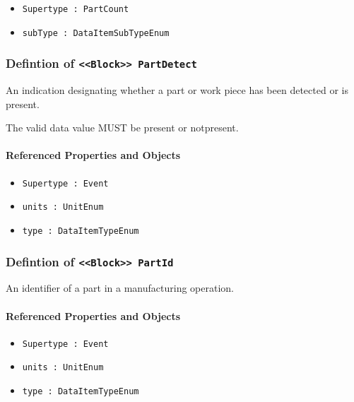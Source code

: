 \begin{itemize}
\item \texttt{Supertype : PartCount}

\item \texttt{subType : DataItemSubTypeEnum}

\end{itemize}
\FloatBarrier
\subsubsection{Defintion of \texttt{<<Block>> PartDetect}}
  \label{type:PartDetect}

\FloatBarrier

An indication designating whether a part or work piece has been detected or is present.
  
 The valid data value MUST be present or notpresent.

\FloatBarrier
\paragraph{Referenced Properties and Objects}

\begin{itemize}
\item \texttt{Supertype : Event}

\item \texttt{units : UnitEnum}

\item \texttt{type : DataItemTypeEnum}

\end{itemize}
\FloatBarrier
\subsubsection{Defintion of \texttt{<<Block>> PartId}}
  \label{type:PartId}

\FloatBarrier

An identifier of a part in a manufacturing operation.

\FloatBarrier
\paragraph{Referenced Properties and Objects}

\begin{itemize}
\item \texttt{Supertype : Event}

\item \texttt{units : UnitEnum}

\item \texttt{type : DataItemTypeEnum}

\end{itemize}
\FloatBarrier
